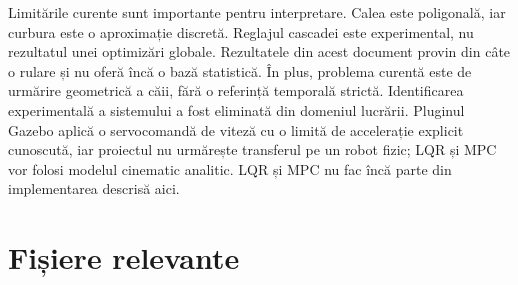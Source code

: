 \documentclass[12pt,a4paper,oneside]{report}
\begin{document}
Limitările curente sunt importante pentru interpretare. Calea este poligonală,
iar curbura este o aproximație discretă. Reglajul cascadei este experimental,
nu rezultatul unei optimizări globale. Rezultatele din acest document provin
din câte o rulare și nu oferă încă o bază statistică. În plus, problema curentă
este de urmărire geometrică a căii, fără o referință temporală strictă.
Identificarea experimentală a sistemului a fost eliminată din domeniul lucrării.
Pluginul Gazebo aplică o servocomandă de viteză cu o limită de accelerație
explicit cunoscută, iar proiectul nu urmărește transferul pe un robot fizic;
LQR și MPC vor folosi modelul cinematic analitic. LQR și MPC nu fac încă parte
din implementarea descrisă aici.

\appendix
\chapter{Fișiere relevante}
\end{document}
